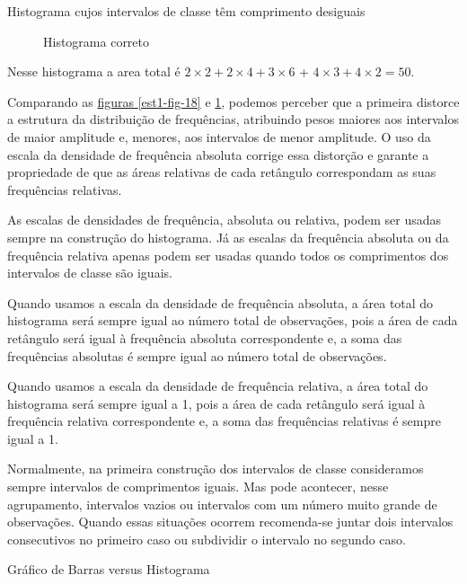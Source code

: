 {\begin{example}{Histograma cujos intervalos de classe têm comprimento desiguais}
\begin{figure}[H]
\begin{tikzpicture}[scale=.4, every node/.style={scale=.75}]

\end{tikzpicture}
\caption{Histograma correto}
\label{est1-fig-19}\end{figure}

Nesse histograma a area total é $2 \times 2 + 2 \times 4 + 3\times 6$ + $  4 \times 3 + 4 \times 2 = 50$. 

Comparando as \hyperref[est1-fig-18]{figuras \ref{est1-fig-18}} e \ref{est1-fig-19}, podemos perceber que a primeira distorce a estrutura da distribuição de frequências, atribuindo pesos maiores aos intervalos de maior amplitude e, menores, aos intervalos de menor amplitude. O uso da escala da densidade de frequência absoluta corrige essa distorção e garante a propriedade de que as áreas relativas de cada retângulo correspondam as suas frequências relativas.
\end{example}

As escalas de densidades de frequência, absoluta ou relativa, podem ser usadas sempre na construção do histograma. Já as escalas da frequência absoluta ou da frequência relativa apenas podem ser usadas quando todos os comprimentos dos intervalos de classe são iguais.

Quando usamos a escala da densidade de frequência absoluta, a área total do histograma será sempre igual ao número total de observações, pois a área de cada retângulo será igual à frequência absoluta correspondente e, a soma das frequências absolutas é sempre igual ao número total de observações.

Quando usamos a escala da densidade de frequência relativa, a área total do histograma será sempre igual a 1, pois a área de cada retângulo será igual à frequência relativa correspondente e, a soma das frequências relativas é sempre igual a 1.

Normalmente, na primeira construção dos intervalos de classe consideramos sempre intervalos de comprimentos iguais. Mas pode acontecer, nesse agrupamento, intervalos vazios ou intervalos com um número muito grande de observações. Quando essas situações ocorrem recomenda-se juntar dois intervalos consecutivos no primeiro caso ou subdividir o intervalo no segundo caso.

\begin{observation}{Gráfico de Barras versus Histograma}


\end{observation}}
